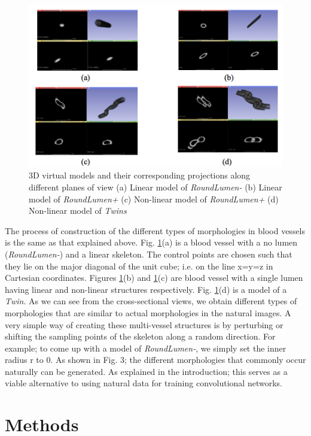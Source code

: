 \begin{figure}[ht!]
\centering
\includegraphics[width=1.0\textwidth]{img/slicer}
\caption{3D virtual models and their corresponding projections along different planes of view (a) Linear model of \textit{RoundLumen-} (b) Linear model of \textit{RoundLumen+} (c) Non-linear model of \textit{RoundLumen+} (d) Non-linear model of \textit{Twins}}
\label{fig:slicer}
\end{figure}

The process of construction of the different types of morphologies in blood vessels is the same as that explained above. Fig.  \ref{fig:slicer}(a) is a blood vessel with a no lumen (\textit{RoundLumen-}) and a linear skeleton. The control points are chosen such that they lie on the major diagonal of the unit cube; i.e. on the line x=y=z in Cartesian coordinates.  Figures  \ref{fig:slicer}(b) and  \ref{fig:slicer}(c) are blood vessel with a single lumen having linear and non-linear structures respectively. Fig.  \ref{fig:slicer}(d) is a model of a \textit{Twin}. As we can see from the cross-sectional views, we obtain different types of morphologies that are similar to actual morphologies in the natural images. A very simple way of creating these multi-vessel structures is by perturbing or shifting the sampling points of the skeleton along a random direction. For example; to come up with a model of \textit{RoundLumen-}, we simply set the inner radius r to 0. As shown in Fig. 3; the different morphologies that commonly occur naturally can be generated. As explained in the introduction; this serves as a viable alternative to using natural data for training convolutional networks.

\section{Methods}

